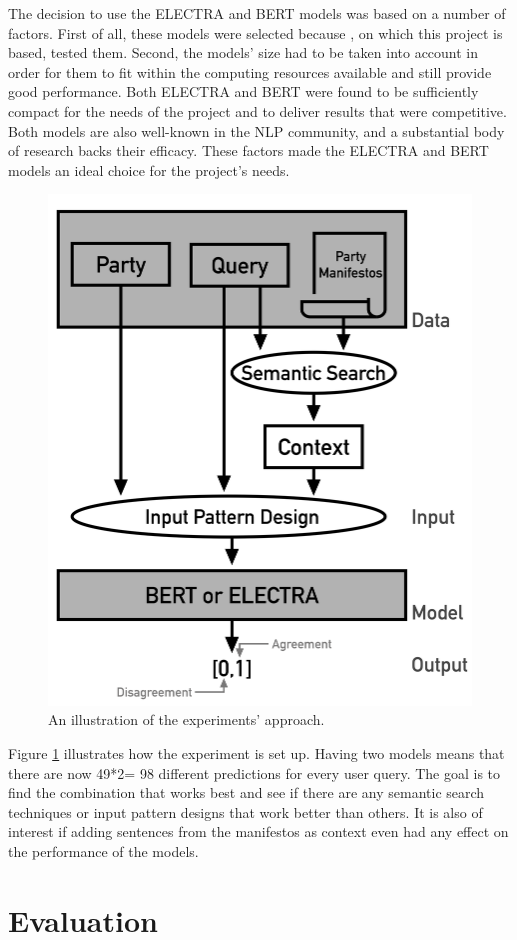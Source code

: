 The decision to use the ELECTRA and BERT models was based on a number of factors. First of all, these models were selected because \citet{witte_2022}, on which this project is based, tested them. Second, the models' size had to be taken into account in order for them to fit within the computing resources available and still provide good performance. Both ELECTRA and BERT were found to be sufficiently compact for the needs of the project and to deliver results that were competitive. Both models are also well-known in the NLP community, and a substantial body of research backs their efficacy. These factors made the ELECTRA and BERT models an ideal choice for the project's needs.

\begin{figure}[h!]
\centering
\includegraphics[width = 0.6\linewidth]{figures/Experiments1.png}
\caption{An illustration of the experiments' approach.}
\label{fig:experiments1}
\end{figure}

Figure \ref{fig:experiments1} illustrates how the experiment is set up. Having two models means that there are now 49*2= 98 different predictions for every user query. The goal is to find the combination that works best and see if there are any semantic search techniques or input pattern designs that work better than others. It is also of interest if adding sentences from the manifestos as context even had any effect on the performance of the models.

\section{Evaluation}

